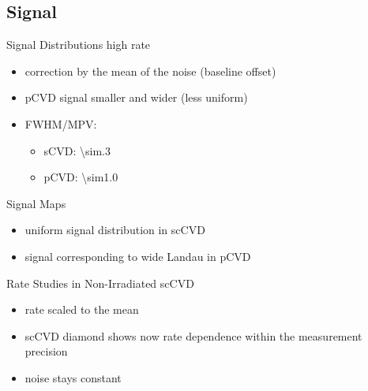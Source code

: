 \subsection{Signal}
\begin{frame}{Signal Distributions \@ high rate}
 
 \vspace*{-15pt}\vspace*{-10pt}

	\begin{itemize} \itemfill
		\item correction by the mean of the noise (baseline offset)
		\item pCVD signal smaller and wider (less uniform)
		\item FWHM/MPV:
		\begin{itemize}
			\item sCVD: \SI{\sim.3}{}
			\item pCVD: \SI{\sim1.0}{}
		\end{itemize}
	\end{itemize}
 
\end{frame}
\begin{frame}{Signal Maps}
	
	
	\begin{itemize} \itemfill
		\item uniform signal distribution in scCVD
		\item signal corresponding to wide Landau in pCVD
	\end{itemize}
 
\end{frame}
\begin{frame}{Rate Studies in Non-Irradiated scCVD}

	
	
	\begin{itemize}\itemfill
		\item rate scaled to the mean
		\item scCVD diamond shows now rate dependence within the measurement precision
		\item noise stays constant
	\end{itemize}
	
\end{frame}
